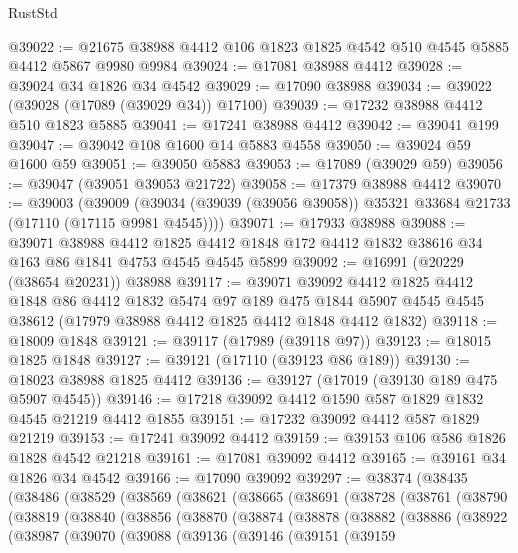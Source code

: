 \begin{lexlean}{RustStd}
\begin{coremodule}
@39022 := @21675 @38988 @4412 @106 @1823 @1825 @4542 @510 @4545 @5885 @4412 @5867 @9980 @9984
@39024 := @17081 @38988 @4412
@39028 := @39024 @34 @1826 @34 @4542
@39029 := @17090 @38988
@39034 := @39022 (@39028 (@17089 (@39029 @34)) @17100)
@39039 := @17232 @38988 @4412 @510 @1823 @5885
@39041 := @17241 @38988 @4412
@39042 := @39041 @199
@39047 := @39042 @108 @1600 @14 @5883 @4558
@39050 := @39024 @59 @1600 @59
@39051 := @39050 @5883
@39053 := @17089 (@39029 @59)
@39056 := @39047 (@39051 @39053 @21722)
@39058 := @17379 @38988 @4412
@39070 := @39003
    (@39009 (@39034 (@39039 (@39056 @39058)) @35321 @33684 @21733 (@17110 (@17115 @9981 @4545))))
@39071 := @17933 @38988
@39088 := @39071
    @38988
    @4412
    @1825
    @4412
    @1848
    @172
    @4412
    @1832
    @38616
    @34
    @163
    @86
    @1841
    @4753
    @4545
    @4545
    @5899
@39092 := @16991 (@20229 (@38654 @20231)) @38988
@39117 := @39071
    @39092
    @4412
    @1825
    @4412
    @1848
    @86
    @4412
    @1832
    @5474
    @97
    @189
    @475
    @1844
    @5907
    @4545
    @4545
    @38612
    (@17979 @38988 @4412 @1825 @4412 @1848 @4412 @1832)
@39118 := @18009 @1848
@39121 := @39117 (@17989 (@39118 @97))
@39123 := @18015 @1825 @1848
@39127 := @39121 (@17110 (@39123 @86 @189))
@39130 := @18023 @38988 @1825 @4412
@39136 := @39127 (@17019 (@39130 @189 @475 @5907 @4545))
@39146 := @17218 @39092 @4412 @1590 @587 @1829 @1832 @4545 @21219 @4412 @1855
@39151 := @17232 @39092 @4412 @587 @1829 @21219
@39153 := @17241 @39092 @4412
@39159 := @39153 @106 @586 @1826 @1828 @4542 @21218
@39161 := @17081 @39092 @4412
@39165 := @39161 @34 @1826 @34 @4542
@39166 := @17090 @39092
@39297 := @38374
    (@38435
      (@38486
        (@38529
          (@38569
            (@38621
              (@38665
                (@38691
                  (@38728
                    (@38761
                      (@38790
                        (@38819
                          (@38840
                            (@38856
                              (@38870
                                (@38874
                                  (@38878
                                    (@38882
                                      (@38886
                                        (@38922
                                          (@38987
                                            (@39070
                                              (@39088
                                                (@39136
                                                  (@39146
                                                    (@39151
                                                      (@39159

\end{coremodule}
\end{lexlean}
